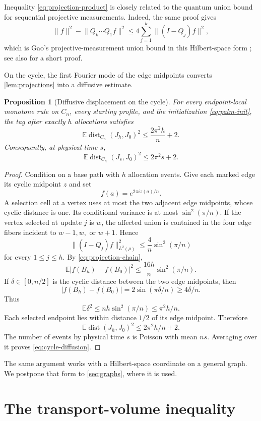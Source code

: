 \documentclass[11pt]{article}
\newtheorem{proposition}[proposition]{Proposition}
\theoremstyle{remark}
\newcommand{\E}{\mathbb{E}}
\newcommand{\dist}{\operatorname{dist}}
\newcommand{\norm}[1]{\lVert #1\rVert}
\begin{document}
Inequality \eqref{eq:projection-product} is closely related to the quantum union bound for sequential projective measurements. Indeed, the same proof gives
\[
 \norm f^2-\norm{Q_k\cdots Q_1f}^2
 \le4\sum_{j=1}^k\norm{(I-Q_j)f}^2,
\]
which is Gao's projective-measurement union bound in this Hilbert-space form \cite{Gao2015}; see also \cite{ODonnellVenkateswaran2022} for a short proof.

On the cycle, the first Fourier mode of the edge midpoints converts \cref{lem:projections} into a diffusive estimate.

\begin{proposition}[Diffusive displacement on the cycle]\label{prop:cycle-diffusion}
For every endpoint-local monotone rule on $C_n$, every starting profile, and the initialization \eqref{eq:palm-init}, the tag after exactly $h$ allocations satisfies
\[
 \E\dist_{C_n}(J_h,J_0)^2\le \frac{2\pi^2h}{n}+2.
 \tag{4.3}\label{eq:cycle-diffusion-events}
\]
Consequently, at physical time $s$,
\[
 \E\dist_{C_n}(J_s,J_0)^2\le2\pi^2s+2.
 \tag{4.4}\label{eq:cycle-diffusion}
\]
\end{proposition}

\begin{proof}
Condition on a base path with $h$ allocation events. Give each marked edge its cyclic midpoint $z$ and set
\[
 f(a)=e^{2\pi iz(a)/n}.
\]
A selection cell at a vertex uses at most the two adjacent edge midpoints, whose cyclic distance is one. Its conditional variance is at most $\sin^2(\pi/n)$. If the vertex selected at update $j$ is $w$, the affected union is contained in the four edge fibers incident to $w-1,w,$ or $w+1$. Hence
\[
 \norm{(I-Q_j)f}_{L^2(\rho)}^2
 \le\frac4n\sin^2(\pi/n)
\]
for every $1\le j\le h$. By \eqref{eq:projection-chain},
\[
 \E|f(B_h)-f(B_0)|^2
 \le\frac{16h}{n}\sin^2(\pi/n).
\]
If $\delta\in[0,n/2]$ is the cyclic distance between the two edge midpoints, then
\[
 |f(B_h)-f(B_0)|=2\sin(\pi\delta/n)\ge4\delta/n.
\]
Thus
\[
 \E\delta^2\le nh\sin^2(\pi/n)\le\pi^2h/n.
\]
Each selected endpoint lies within distance $1/2$ of its edge midpoint. Therefore
\[
 \E\dist(J_h,J_0)^2\le2\pi^2h/n+2.
\]
The number of events by physical time $s$ is Poisson with mean $ns$. Averaging over it proves \eqref{eq:cycle-diffusion}.
\end{proof}

The same argument works with a Hilbert-space coordinate on a general graph. We postpone that form to \cref{sec:graphs}, where it is used.

\section{The transport-volume inequality}\label{sec:transport}
\end{document}
